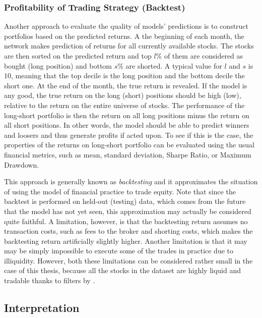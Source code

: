 		\subsubsection{Profitability of Trading Strategy (Backtest)}
			\label{chap:met_backtest}
			Another approach to evaluate the quality of models' predictions is to construct portfolios based on the predicted returns. A the beginning of each month, the network makes prediction of returns for all currently available stocks. The stocks are then sorted on the predicted return and top $l\%$ of them are considered as bought (long position) and bottom $s\%$ are shorted. A typical value for $l$ and $s$ is $10$, meaning that the top decile is the long position and the bottom decile the short one. At the end of the month, the true return is revealed. If the model is any good, the true return on the long (short) positions should be high (low), relative to the return on the entire universe of stocks. The performance of the long-short portfolio is then the return on all long positions minus the return on all short positions. In other words, the model should be able to predict winners and loosers and thus generate profits if acted upon. To see if this is the case, the properties of the returns on long-short portfolio can be evaluated using the usual financial metrics, such as mean, standard deviation, Sharpe Ratio, or Maximum Drawdown. 
			
			This approach is generally known as \textit{backtesting} and it approximates the situation of using the model of financial practice to trade equity. Note that since the backtest is performed on held-out (testing) data, which comes from the future that the model has not yet seen, this approximation may actually be considered quite faithful. A limitation, however, is that the backtesting return assumes no transaction costs, such as fees to the broker and shorting costs, which makes the backtesting return artificially slightly higher. Another limitation is that it may may be simply impossible to execute some of the trades in practice  due to illiquidity. However, both these limitations can be considered rather small in the case of this thesis, because all the stocks in the dataset are highly liquid and tradable thanks to filters by \cite{tobek2020does}. 
	
	
	\subsection{Interpretation}
	
